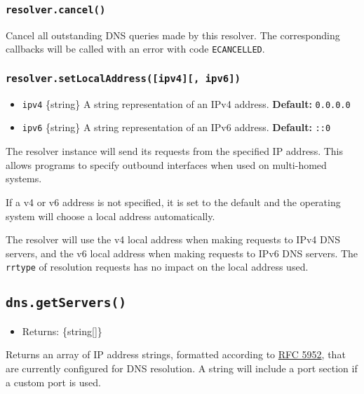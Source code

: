 \subsubsection{\texorpdfstring{\texttt{resolver.cancel()}}{resolver.cancel()}}\label{resolver.cancel}

Cancel all outstanding DNS queries made by this resolver. The
corresponding callbacks will be called with an error with code
\texttt{ECANCELLED}.

\subsubsection{\texorpdfstring{\texttt{resolver.setLocalAddress({[}ipv4{]}{[},\ ipv6{]})}}{resolver.setLocalAddress({[}ipv4{]}{[}, ipv6{]})}}\label{resolver.setlocaladdressipv4-ipv6}

\begin{itemize}
\tightlist
\item
  \texttt{ipv4} \{string\} A string representation of an IPv4 address.
  \textbf{Default:} \texttt{\textquotesingle{}0.0.0.0\textquotesingle{}}
\item
  \texttt{ipv6} \{string\} A string representation of an IPv6 address.
  \textbf{Default:} \texttt{\textquotesingle{}::0\textquotesingle{}}
\end{itemize}

The resolver instance will send its requests from the specified IP
address. This allows programs to specify outbound interfaces when used
on multi-homed systems.

If a v4 or v6 address is not specified, it is set to the default and the
operating system will choose a local address automatically.

The resolver will use the v4 local address when making requests to IPv4
DNS servers, and the v6 local address when making requests to IPv6 DNS
servers. The \texttt{rrtype} of resolution requests has no impact on the
local address used.

\subsection{\texorpdfstring{\texttt{dns.getServers()}}{dns.getServers()}}\label{dns.getservers}

\begin{itemize}
\tightlist
\item
  Returns: \{string{[}{]}\}
\end{itemize}

Returns an array of IP address strings, formatted according to
\href{https://tools.ietf.org/html/rfc5952\#section-6}{RFC 5952}, that
are currently configured for DNS resolution. A string will include a
port section if a custom port is used.

